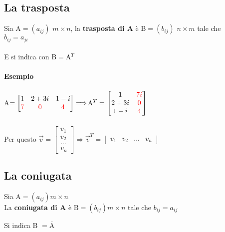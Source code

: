 \subsection{La trasposta}
Sia A$=(a_{ij})$ $m\times n$, la \textbf{trasposta di A} è B$=(b_{ij})$ $n\times m$ tale che \\

$b_{ij}=a_{ji}$\\\\
E si indica con B$=$A$^T$

\paragraph{Esempio}  A$=
\begin{bmatrix}
    1 & 2+3i & 1-i \\
    {\color{red} 7} & {\color{red}0} & {\color{red}4}
\end{bmatrix}
\Longrightarrow
$A$^{T}=
\begin{bmatrix}
    1 & {\color{red}7i}\\
    2+3i & {\color{red}0}\\
    1-i & {\color{red}4}
\end{bmatrix}
$\\\\
Per questo $\vec{v}=
\begin{bmatrix}
    v_1 \\ v_2 \\ ...\\v_n
\end{bmatrix}
\Longrightarrow
\vec{v}^T=
\begin{bmatrix}
    v_1 & v_2 & ... & v_n
\end{bmatrix}
$
\subsection{La coniugata}
Sia A$=(a_{ij})m\times n$\\
La \textbf{coniugata di A} è B$=(b_{ij})m\times n$ tale che $b_{ij}=a_{ij}$
\begin{center}
    Si indica B $= \overline{\textrm{A}}$
\end{center}
